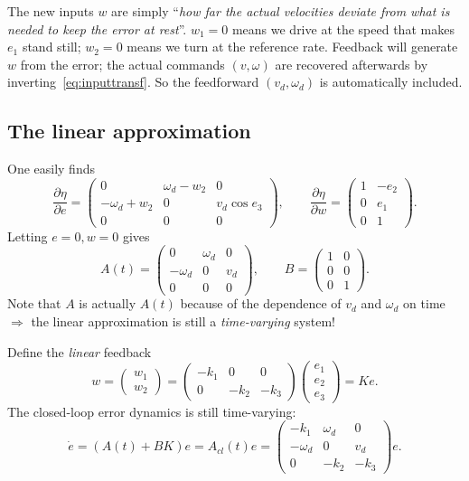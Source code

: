 \documentclass[11pt,a4paper]{article}
\def\bm#1{#1}%
\def\vect#1{#1}%
\newcommand{\vect}[1]{\bm{#1}}
\newcommand{\vd}{v_d}
\newcommand{\omd}{\omega_d}
\newcommand{\Acl}{\vect{A}_{cl}}
\theoremstyle{definition}
\theoremstyle{plain}
\theoremstyle{remark}
\begin{document}
\begin{intuition}
The new inputs $\vect w$ are simply ``\emph{how far the actual velocities deviate from what is needed to keep the error at rest}''. $w_1=0$ means we drive at the speed that makes $e_1$ stand still; $w_2=0$ means we turn at the reference rate. Feedback will generate $\vect w$ from the error; the actual commands $(v,\omega)$ are recovered afterwards by inverting~\eqref{eq:inputtransf}. So the feedforward $(\vd,\omd)$ is automatically included.
\end{intuition}

\subsection{The linear approximation}

One easily finds
\[
\frac{\partial\vect\eta}{\partial\vect e}=\begin{pmatrix}0&\omd-w_2&0\\-\omd+w_2&0&\vd\cos e_3\\0&0&0\end{pmatrix},\qquad
\frac{\partial\vect\eta}{\partial\vect w}=\begin{pmatrix}1&-e_2\\0&e_1\\0&1\end{pmatrix}.
\]
Letting $\vect e=\vect 0,\vect w=\vect 0$ gives
\[
\vect A(t)=\begin{pmatrix}0&\omd&0\\-\omd&0&\vd\\0&0&0\end{pmatrix},\qquad
\vect B=\begin{pmatrix}1&0\\0&0\\0&1\end{pmatrix}.
\]
Note that $\vect A$ is actually $\vect A(t)$ because of the dependence of $\vd$ and $\omd$ on time $\Rightarrow$ the linear approximation is still a \emph{time-varying} system!

Define the \emph{linear} feedback
\[
\vect w=\begin{pmatrix}w_1\\w_2\end{pmatrix}=\begin{pmatrix}-k_1&0&0\\0&-k_2&-k_3\end{pmatrix}\begin{pmatrix}e_1\\e_2\\e_3\end{pmatrix}=\vect K\vect e .
\]
The closed-loop error dynamics is still time-varying:
\begin{equation}\label{eq:Acl}
\dot{\vect e}=(\vect A(t)+\vect B\vect K)\vect e=\Acl(t)\vect e=\begin{pmatrix}-k_1&\omd&0\\-\omd&0&\vd\\0&-k_2&-k_3\end{pmatrix}\vect e .
\end{equation}
\end{document}
